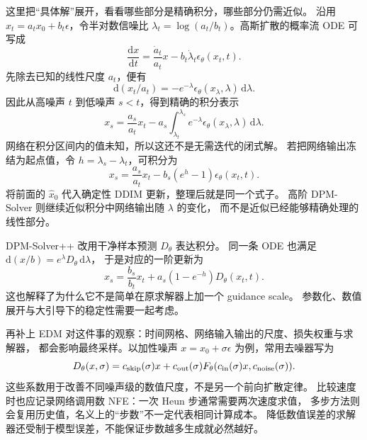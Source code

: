 这里把“具体解”展开，看看哪些部分是精确积分，哪些部分仍需近似。
沿用 $x_t=a_tx_0+b_t\epsilon$，令半对数信噪比
$\lambda_t=\log(a_t/b_t)$。高斯扩散的概率流 ODE 可写成
\[
\frac{\mathrm dx}{\mathrm dt}=\frac{\dot a_t}{a_t}x
 -b_t\dot\lambda_t\epsilon_\theta(x_t,t).
\]
先除去已知的线性尺度 $a_t$，便有
\[
\mathrm d(x_t/a_t)=-e^{-\lambda}\epsilon_\theta(x_\lambda,\lambda)\,\mathrm d\lambda.
\]
因此从高噪声 $t$ 到低噪声 $s<t$，得到精确的积分表示
\[
x_s=\frac{a_s}{a_t}x_t-a_s\int_{\lambda_t}^{\lambda_s}
 e^{-\lambda}\epsilon_\theta(x_\lambda,\lambda)\,\mathrm d\lambda.
\]
网络在积分区间内的值未知，所以这还不是无需迭代的闭式解。
若把网络输出冻结为起点值，令 $h=\lambda_s-\lambda_t$，可积分为
\[
x_s=\frac{a_s}{a_t}x_t-b_s(e^h-1)\epsilon_\theta(x_t,t).
\]
将前面的 $\hat x_0$ 代入确定性 DDIM 更新，整理后就是同一个式子。
高阶 DPM-Solver 则继续近似积分中网络输出随 $\lambda$ 的变化，
而不是近似已经能够精确处理的线性部分。\cite{dpm}

DPM-Solver++ 改用干净样本预测 $D_\theta$ 表达积分。
同一条 ODE 也满足 $\mathrm d(x/b)=e^\lambda D_\theta\,\mathrm d\lambda$，
于是对应的一阶更新为
\[
x_s=\frac{b_s}{b_t}x_t+a_s(1-e^{-h})D_\theta(x_t,t).
\]
这也解释了为什么它不是简单在原求解器上加一个 guidance scale。
参数化、数值展开与大引导下的稳定性需要一起考虑。\cite{dpmpp}

再补上 EDM 对这件事的观察：时间网格、网络输入输出的尺度、损失权重与求解器，
都会影响最终采样。以加性噪声 $x=x_0+\sigma\epsilon$ 为例，常用去噪器写为
\[
D_\theta(x,\sigma)=c_{\rm skip}(\sigma)x+
 c_{\rm out}(\sigma)F_\theta(c_{\rm in}(\sigma)x,c_{\rm noise}(\sigma)).
\]
这些系数用于改善不同噪声级的数值尺度，不是另一个前向扩散定律。
比较速度时也应记录网络调用数 NFE：一次 Heun 步通常需要两次速度求值，
多步方法则会复用历史值，名义上的“步数”不一定代表相同计算成本。
降低数值误差的求解器还受制于模型误差，不能保证步数越多生成就必然越好。\cite{edm}

